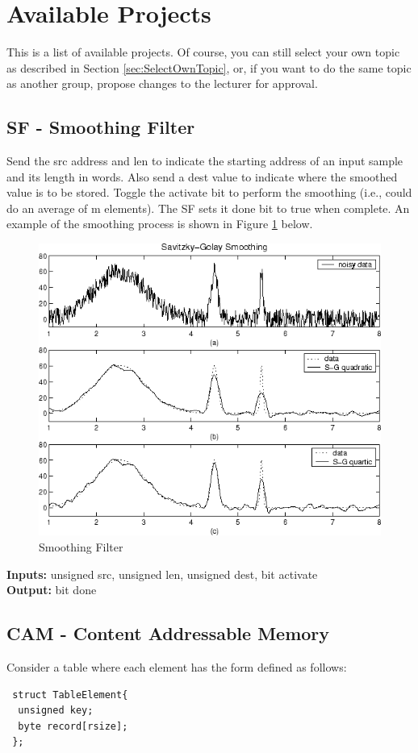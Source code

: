 \section{Available Projects}
This is a list of available projects. Of course, you can still select your own topic as described in Section \ref{sec:SelectOwnTopic}, or, if you want to do the same topic as another group, propose changes to the lecturer for approval.

\subsection{SF - Smoothing Filter}
Send the src address and len to indicate the starting address of an input sample and its length in words. Also send a dest value to indicate where the smoothed value is to be stored. Toggle the activate bit to perform the smoothing (i.e., could do an average of m elements). The SF sets it done bit to true when complete. An example of the smoothing process is shown in Figure \ref{fig:smooth_sg2} below.

\begin{figure}[H]
\centering
\includegraphics[width=0.6\columnwidth]{Figures/smooth_sg2}
\caption{Smoothing Filter}
\label{fig:smooth_sg2}
\end{figure}


\textbf{Inputs:} unsigned src, unsigned len, unsigned dest, bit activate\\
\textbf{Output:} bit done

\subsection{CAM - Content Addressable Memory}
Consider a table where each element has the form defined as follows:
\begin{lstlisting}
 struct TableElement{
  unsigned key;
  byte record[rsize];
 };
\end{lstlisting}

